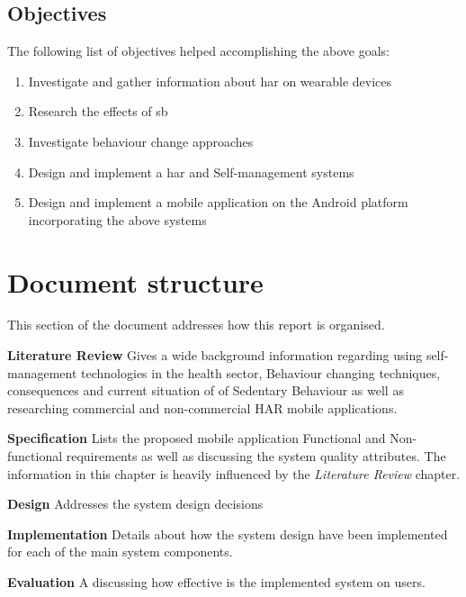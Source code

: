     \subsection*{Objectives}
    The following list of objectives helped accomplishing the above goals: 
    \begin{enumerate}
        \item Investigate and gather information about \gls{har} on wearable devices
        \item Research the effects of \gls{sb}
        \item Investigate behaviour change approaches
        \item Design and implement a \gls{har} and Self-management systems
        \item Design and implement a mobile application on the Android platform incorporating the above systems 
    \end{enumerate}
    
    \section{Document structure}
    This section of the document addresses how this report is organised.\newline
    
    \textbf{Literature Review} Gives a wide background information regarding using self-management technologies in the health sector, Behaviour changing techniques, consequences and current situation of of Sedentary Behaviour as well as researching commercial and non-commercial HAR mobile applications.\newline
    
    
    \textbf{Specification} Lists the proposed mobile application Functional and Non-functional requirements as well as discussing the system quality attributes. The information in this chapter is heavily influenced by the \textit{Literature Review} chapter.\newline
    
    
    \textbf{Design} Addresses the system design decisions\newline
    
    
    \textbf{Implementation} Details about how the system design have been implemented for each of the main system components.\newline
    
    
    \textbf{Evaluation} A discussing how effective is the implemented system on users.\newline
    
